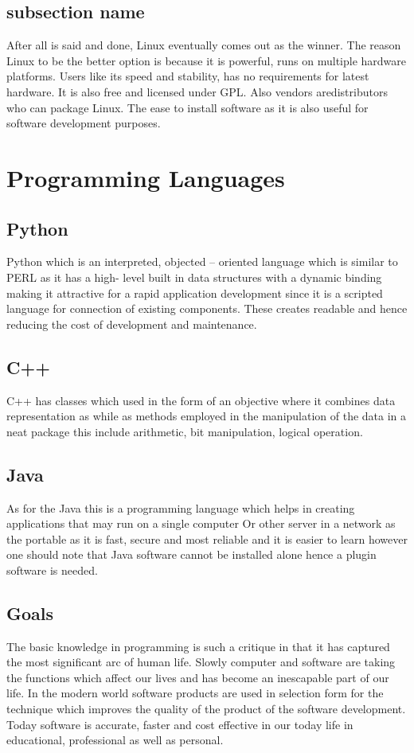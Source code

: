 \documentclass{scrreprt}
\begin{document}
\subsection{subsection name}
After all is said and done, Linux eventually comes out as the winner. The reason Linux to be the better
option is because it is powerful, runs on multiple hardware platforms. Users like its speed and stability,
has no requirements for latest hardware. It is also free and licensed under GPL. Also vendors aredistributors who can package Linux. The ease to install software as it is also useful for software
development purposes.


\section{Programming Languages}

\subsection{Python}
Python which is an interpreted, objected – oriented language which is similar to PERL as it has a high-
level built in data structures with a dynamic binding making it attractive for a rapid application
development since it is a scripted language for connection of existing components. These creates
readable and hence reducing the cost of development and maintenance.

\subsection{C++}
C++ has classes which used in the form of an objective where it combines data representation as while
as methods employed in the manipulation of the data in a neat package this include arithmetic, bit
manipulation, logical operation.

\subsection{Java}
As for the Java this is a programming language which helps in creating applications that may run on a
single computer Or other server in a network as the portable as it is fast, secure and most reliable and it
is easier to learn however one should note that Java software cannot be installed alone hence a plugin
software is needed.

\subsection{Goals}
The basic knowledge in programming is such a critique in that it has captured the most significant arc of
human life. Slowly computer and software are taking the functions which affect our lives and has
become an inescapable part of our life. In the modern world software products are used in selection
form for the technique which improves the quality of the product of the software development. Today
software is accurate, faster and cost effective in our today life in educational, professional as well as
personal.
\end{document}
